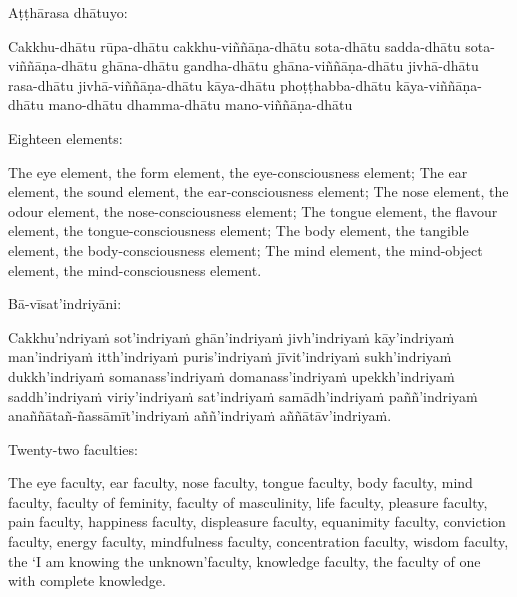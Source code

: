 \suttaRef{[MN 148]}

\begin{pali-hang-continued}
  Aṭṭhārasa dhātuyo:
  \begin{pali-hangtogether}
    Cakkhu-dhātu rūpa-dhātu cakkhu-viññāṇa-dhātu sota-dhātu sadda-dhātu sota-viññāṇa-dhātu ghāna-dhātu gandha-dhātu ghāna-viññāṇa-dhātu jivhā-dhātu rasa-dhātu jivhā-viññāṇa-dhātu kāya-dhātu phoṭṭhabba-dhātu kāya-viññāṇa-dhātu mano-dhātu dhamma-dhātu mano-viññāṇa-dhātu
  \end{pali-hangtogether}
\end{pali-hang-continued}

\begin{english-verses}
  Eighteen elements:
  \begin{english-hangtogether-verses}
    The eye element, the form element, the eye-consciousness element; The ear element, the sound element, the ear-consciousness element; The nose element, the odour element, the nose-consciousness element; The tongue element, the flavour element, the tongue-consciousness element; The body element, the tangible element, the body-consciousness element; The mind element, the mind-object element, the mind-consciousness element.
  \end{english-hangtogether-verses}
\end{english-verses}

\suttaRef{[MN 115]}

\begin{pali-hang-continued}
  Bā-vīsat'indriyāni:\makeatletter\hyperlink{endnote131-appendix}\makeatother
  \begin{pali-hangtogether}
    Cakkhu'ndriyaṁ sot'indriyaṁ ghān'indriyaṁ jivh'indriyaṁ kāy'indriyaṁ man'indriyaṁ itth'indriyaṁ puris'indriyaṁ jīvit'indriyaṁ sukh'indriyaṁ dukkh'indriyaṁ somanass'indriyaṁ domanass'indriyaṁ upekkh'indriyaṁ saddh'indriyaṁ viriy'indriyaṁ sat'indriyaṁ samādh'indriyaṁ paññ'indriyaṁ anaññātañ-ñassāmīt'indriyaṁ aññ'indriyaṁ aññātāv'indriyaṁ.
  \end{pali-hangtogether}
\end{pali-hang-continued}

\begin{english-verses}
  Twenty-two faculties:
  \begin{english-hangtogether-verses}
    The eye faculty, ear faculty, nose faculty, tongue faculty, body faculty, mind faculty, faculty of feminity, faculty of masculinity, life faculty, pleasure faculty, pain faculty, happiness faculty, displeasure faculty, equanimity faculty, conviction faculty, energy faculty, mindfulness faculty, concentration faculty, wisdom faculty, the `I am knowing the unknown'faculty, knowledge faculty, the faculty of one with complete knowledge.
  \end{english-hangtogether-verses}
\end{english-verses}

